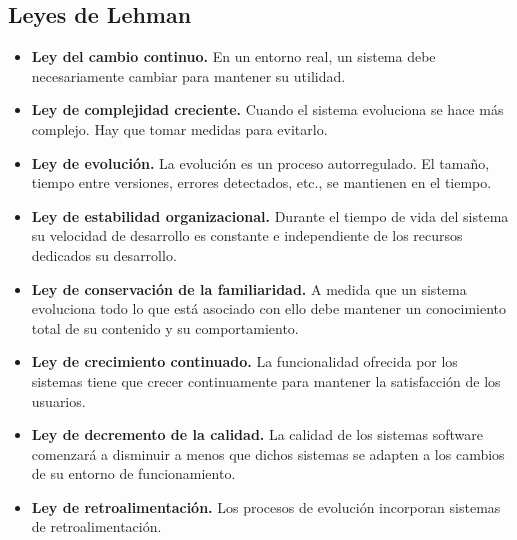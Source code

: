 \subsection{Leyes de Lehman}\label{subsec:leyes-de-lehman}
\begin{itemize}
    \item \textbf{Ley del cambio continuo.} En un entorno real, un sistema debe necesariamente cambiar para mantener su utilidad.
    \item \textbf{Ley de complejidad creciente.} Cuando el sistema evoluciona se hace más complejo.
    Hay que tomar medidas para evitarlo.
    \item \textbf{Ley de evolución. }La evolución es un proceso autorregulado.
    El tamaño, tiempo entre versiones, errores detectados, etc., se mantienen en el tiempo.
    \item \textbf{Ley de estabilidad organizacional.} Durante el tiempo de vida del sistema su velocidad de desarrollo es constante e independiente de los recursos dedicados su desarrollo.
    \item \textbf{Ley de conservación de la familiaridad.} A medida que un sistema evoluciona todo lo que está asociado con ello debe mantener un conocimiento total de su contenido y su comportamiento.
    \item \textbf{Ley de crecimiento continuado. }La funcionalidad ofrecida por los sistemas tiene que crecer continuamente para
    mantener la satisfacción de los usuarios.
    \item \textbf{Ley de decremento de la calidad.} La calidad de los sistemas software comenzará a disminuir a menos que dichos
    sistemas se adapten a los cambios de su entorno de funcionamiento.
    \item \textbf{Ley de retroalimentación.} Los procesos de evolución incorporan sistemas de retroalimentación.
\end{itemize}

